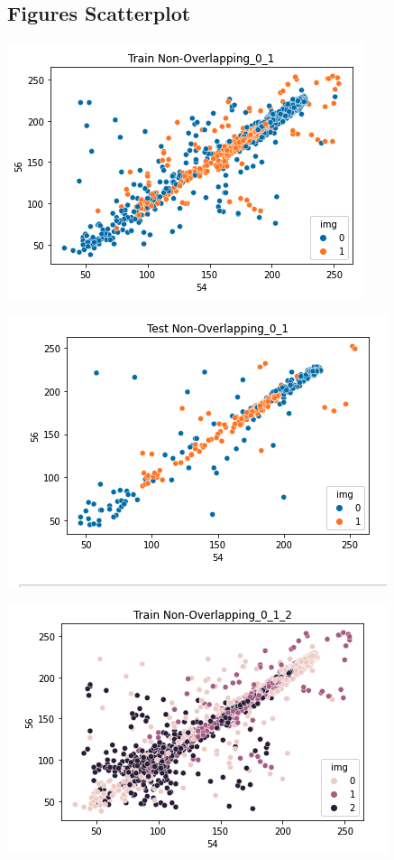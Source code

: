 \documentclass[12pt]{article}
\begin{document}
\begin{multicols*}{2}
  \subsection{Figures Scatterplot} 
	\begin{center}
		\includegraphics[scale=0.3]{../screenshot/train_scatter_non_over_01.png}

		\includegraphics[scale=0.3]{../screenshot/test_scatter_non_over_01.png}

		\includegraphics[scale=0.3]{../screenshot/train_scatter_nonover_012.png}


\end{center}
\end{multicols*}
\end{document}
